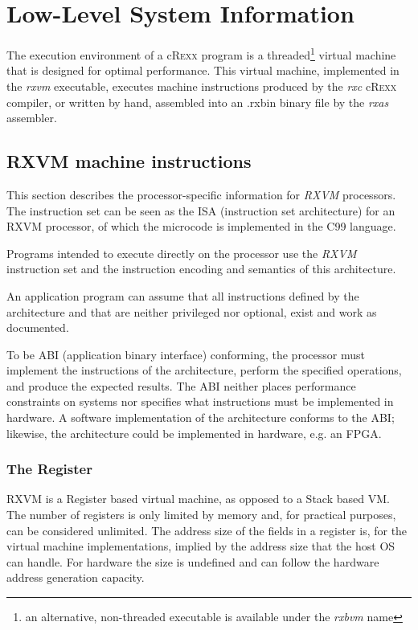 \documentclass[english,11pt,twoside,toc=bib,toc=idx]{scrreprt}
\newcommand{\crexx}{c\textsc{Rexx}}
\begin{document}
\chapter{Low-Level System Information}
The execution environment of a \crexx{} program is a
threaded\footnote{an alternative, non-threaded executable is available
  under the \emph{rxbvm} name} virtual
machine that is designed for optimal performance. This virtual
machine, implemented in the \emph{rxvm} executable, executes
machine instructions produced by the \emph{rxc} \crexx{}
compiler, or written by hand, assembled into an .rxbin binary file by
the \emph{rxas} assembler.

\section{RXVM machine instructions}

This section describes the processor-specific information for
\emph{RXVM} processors. The instruction set can be seen as the ISA
(instruction set architecture) for
an RXVM processor, of which the microcode is implemented in the C99 language.

Programs intended to execute directly on the processor use the
\emph{RXVM} instruction set and the
instruction encoding and semantics of this architecture.

An application program can assume that all instructions defined by the
architecture and that are neither privileged nor optional, exist and work
as documented.

To be ABI (application binary interface) conforming, the processor must implement the instructions of
the architecture, perform the specified operations, and produce the
expected results.  The ABI neither places performance constraints on
systems nor specifies what instructions must be implemented in
hardware.  A software implementation of the architecture conforms to
the ABI; likewise, the architecture could be implemented in hardware,
e.g. an FPGA.

\subsection{The Register}
RXVM is a Register based virtual machine, as opposed to a Stack based
VM. The number of registers is only limited by memory and, for
practical purposes, can be considered unlimited. The address size of
the fields in a register is, for the virtual machine implementations,
implied by the address size that the host OS can handle. For hardware
the size is undefined and can follow the hardware address generation
capacity.
\end{document}
